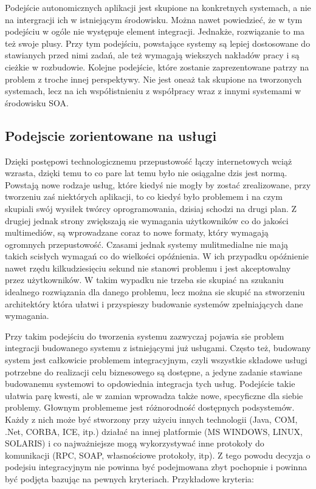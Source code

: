 Podejście autonomicznych aplikacji jest  skupione na konkretnych systemach, a nie na intergracji ich w istniejącym środowisku. Można nawet powiedzieć, że w tym podejściu w ogóle nie występuje element integracji. Jednakże, rozwiązanie to ma też swoje plusy. Przy tym podejściu, powstające systemy są lepiej dostosowane do stawianych przed nimi zadań, ale też wymagają wiekszych nakładów pracy i są cieżkie w rozbudowie. Kolejne podejście, które zostanie zaprezentowane  patrzy na problem z troche innej perspektywy. Nie jest oneaż tak  skupione na tworzonych systemach, lecz na ich współistnieniu z współpracy wraz z innymi systemami w środowisku SOA.

\subsection {Podejscie zorientowane na usługi}
Dzięki postępowi technologicznemu przepustowość łączy internetowych wciąż wzrasta, dzięki temu to co pare lat temu było nie osiągalne dzis jest normą. Powstają nowe rodzaje usług, które kiedyś nie mogły by zostać zrealizowane, przy tworzeniu zaś niektórych aplikacji, to co kiedyś było problemem i na czym skupiali swój wysiłek twórcy oprogramowania, dzisiaj schodzi na drugi plan. Z drugiej jednak strony zwiększają sie wymagania użytkowników co do jakości multimediów, są wprowadzane coraz to nowe formaty, który wymagają ogromnych przepustowość. Czasami jednak systemy mulitmedialne nie mają takich scisłych wymagań co do wielkości opóźnienia. W ich przypadku opóźnienie nawet rzędu kilkudziesięciu sekund nie stanowi problemu i jest akceptowalny przez użytkowników. W takim wypadku nie trzeba sie skupiać na szukaniu idealnego rozwiązania dla danego problemu, lecz można sie skupić na stworzeniu architektóry która ułatwi i przyspieszy budowanie systemów zpełniających dane wymagania.

Przy takim podejściu do tworzenia systemu zazwyczaj pojawia sie problem integracji budowanego systemu z istniejącymi już usługami. Często też, budowany system jest całkowicie problemem integracyjnym, czyli wszystkie składowe usługi potrzebne do realizacji celu biznesowego są dostępne, a jedyne zadanie stawiane budowanemu systemowi to opdowiednia integracja tych usług. Podejście takie ułatwia parę kwesti, ale w zamian wprowadza także nowe, specyficzne dla siebie problemy. Głownym problememe jest różnorodność dostępnych podsystemów. Każdy z nich może być stworzony przy użyciu innych technologii (Java, COM, .Net, CORBA, ICE, itp.) działać na innej platformie (MS WINDOWS, LINUX, SOLARIS) i co najważniejsze mogą wykorzystywać inne protokoły do komunikacji (RPC, SOAP, własnościowe protokoły, itp). Z tego powodu decyzja o podejsiu integracyjnym nie powinna być podejmowana zbyt pochopnie i powinna być podjęta bazując na pewnych kryteriach. Przykładowe kryteria:  \cite{hohpewoolf2003} 

